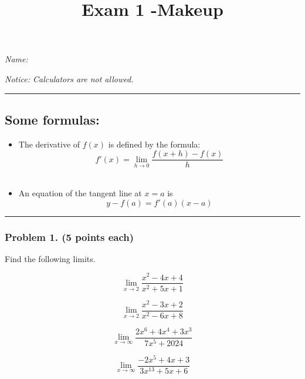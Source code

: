 \documentclass[
  letterpaper,
  DIV=11,
  numbers=noendperiod]{scrartcl}
\title{Exam 1 -Makeup}
\author{}
\date{}
\begin{document}
\maketitle

\thispagestyle{empty}

\emph{Name:}

\emph{Notice: Calculators are not allowed. }

\begin{center}\rule{0.5\linewidth}{0.5pt}\end{center}

\subsection{Some formulas:}\label{some-formulas}

\begin{itemize}
\item
  The derivative of \(f(x)\) is defined by the formula: \[
  f'(x) = \lim_{h \to 0} \frac{f(x+h)-f(x)}{h}
  \]\\
\item
  An equation of the tangent line at \(x = a\) is \[
  y - f(a) = f'(a)(x-a)
  \]
\end{itemize}

\begin{center}\rule{0.5\linewidth}{0.5pt}\end{center}

\subsubsection{Problem 1. (5 points
each)}\label{problem-1.-5-points-each}

Find the following limits.

\[\lim_{x \to 2} \frac{x^2 - 4x + 4}{x^2 +5x + 1}\]

\hfill\break
\hfill\break
\hfill\break
\hfill\break

\thispagestyle{empty}

\[\lim_{x \to 2} \frac{x^2 - 3x + 2}{x^2 -6x + 8}\]

\hfill\break
\hfill\break
\hfill\break
\hfill\break
\hfill\break

\[\lim_{x \to \infty} \frac{2x^6 +4x^4 + 3x^3}{7x^5 + 2024}\]

\hfill\break
\hfill\break
\hfill\break
\hfill\break
\hfill\break

\[\lim_{x \to \infty} \frac{-2x^5 +4x + 3}{3x^{13} +5x + 6}\]

\hfill\break
\hfill\break
\hfill\break
\hfill\break
\hfill\break
\end{document}
